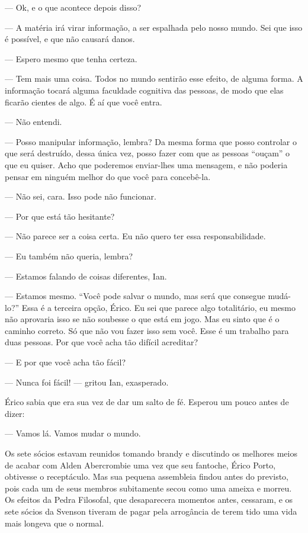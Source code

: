 --- Ok, e o que acontece depois disso?

--- A matéria irá virar informação, a ser espalhada pelo nosso mundo.
Sei que isso é possível, e que não causará danos.

--- Espero mesmo que tenha certeza.

--- Tem mais uma coisa. Todos no mundo sentirão esse efeito, de alguma
forma. A informação tocará alguma faculdade cognitiva das pessoas, de
modo que elas ficarão cientes de algo. É aí que você entra.

--- Não entendi.

--- Posso manipular informação, lembra? Da mesma forma que posso
controlar o que será destruído, dessa única vez, posso fazer com que as
pessoas “ouçam” o que eu quiser. Acho que poderemos enviar-lhes uma
mensagem, e não poderia pensar em ninguém melhor do que você para
concebê-la.

--- Não sei, cara. Isso pode não funcionar.

--- Por que está tão hesitante?

--- Não parece ser a coisa certa. Eu não quero ter essa
responsabilidade.

--- Eu também não queria, lembra?

--- Estamos falando de coisas diferentes, Ian.

--- Estamos mesmo. “Você pode salvar o mundo, mas será que consegue
mudá-lo?” Essa é a terceira opção, Érico. Eu sei que parece algo
totalitário, eu mesmo não aprovaria isso se não soubesse o que está em
jogo. Mas eu sinto que é o caminho correto. Só que não vou fazer isso
sem você. Esse é um trabalho para duas pessoas. Por que você acha tão
difícil acreditar?

--- E por que você acha tão fácil?

--- Nunca foi fácil! --- gritou Ian, exasperado.

Érico sabia que era sua vez de dar um salto de fé. Esperou um pouco
antes de dizer:

--- Vamos lá. Vamos mudar o mundo.

\espaco


Os sete sócios estavam reunidos tomando brandy e discutindo os melhores
meios de acabar com Alden Abercrombie uma vez que seu fantoche, Érico
Porto, obtivesse o receptáculo. Mas sua pequena assembleia findou antes
do previsto, pois cada um de seus membros subitamente secou como uma
 ameixa e morreu. Os efeitos da Pedra Filosofal, que desaparecera
 momentos antes, cessaram, e os sete sócios da Svenson tiveram de pagar
 pela arrogância de terem tido uma vida mais longeva que o normal.


